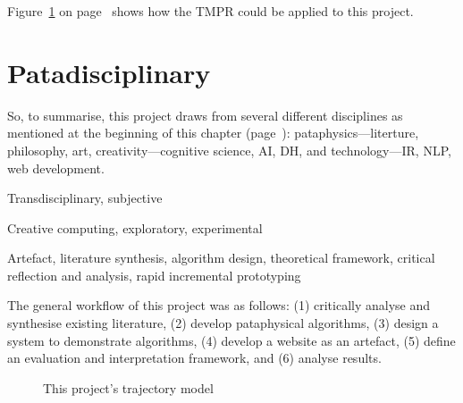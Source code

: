 Figure~\ref{fig:ftmpr} on page~\pageref{fig:ftmpr} shows how the \ac{TMPR} could be applied to this project. 


\section{Patadisciplinary}
\label{s:mymeth}

So, to summarise, this project draws from several different disciplines as mentioned at the beginning of this chapter (page~\pageref{ch:methodology}): pataphysics---literture, philosophy, art, creativity---cognitive science, \ac{AI}, \ac{DH}, and technology---\ac{IR}, \ac{NLP}, web development.

\begin{description}[leftmargin=3.2cm]
  \item [Epistemology] Transdisciplinary, subjective
  \item [Methodology] Creative computing, exploratory, experimental
  \item [Methods] Artefact, literature synthesis, algorithm design, theoretical framework, critical reflection and analysis, rapid incremental prototyping
\end{description}

The general workflow of this project was as follows: (1) critically analyse and synthesise existing literature, (2) develop pataphysical algorithms, (3) design a system to demonstrate algorithms, (4) develop a website as an artefact, (5) define an evaluation and interpretation framework, and (6) analyse results.

\begin{figure}[!htbp] %
  \centering
  \caption[This project's trajectory model]{This project's trajectory model}
\label{fig:ftmpr}
\end{figure}

